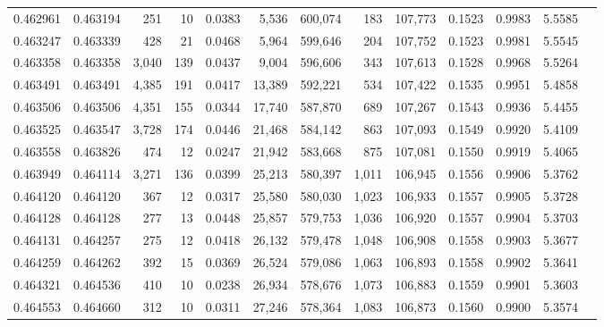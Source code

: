 \begin{tabular}{rrrrrrrrrrrrr}
0.462961 & 0.463194 &   251 &    10 &                                     0.0383 &   5,536 & 600,074 &     183 & 107,773 & 0.1523 & 0.9983 & 5.5585 \\
0.463247 & 0.463339 &   428 &    21 &                                     0.0468 &   5,964 & 599,646 &     204 & 107,752 & 0.1523 & 0.9981 & 5.5545 \\
0.463358 & 0.463358 & 3,040 &   139 &                                     0.0437 &   9,004 & 596,606 &     343 & 107,613 & 0.1528 & 0.9968 & 5.5264 \\
0.463491 & 0.463491 & 4,385 &   191 &                                     0.0417 &  13,389 & 592,221 &     534 & 107,422 & 0.1535 & 0.9951 & 5.4858 \\
0.463506 & 0.463506 & 4,351 &   155 &                                     0.0344 &  17,740 & 587,870 &     689 & 107,267 & 0.1543 & 0.9936 & 5.4455 \\
0.463525 & 0.463547 & 3,728 &   174 &                                     0.0446 &  21,468 & 584,142 &     863 & 107,093 & 0.1549 & 0.9920 & 5.4109 \\
0.463558 & 0.463826 &   474 &    12 &                                     0.0247 &  21,942 & 583,668 &     875 & 107,081 & 0.1550 & 0.9919 & 5.4065 \\
0.463949 & 0.464114 & 3,271 &   136 &                                     0.0399 &  25,213 & 580,397 &   1,011 & 106,945 & 0.1556 & 0.9906 & 5.3762 \\
0.464120 & 0.464120 &   367 &    12 &                                     0.0317 &  25,580 & 580,030 &   1,023 & 106,933 & 0.1557 & 0.9905 & 5.3728 \\
0.464128 & 0.464128 &   277 &    13 &                                     0.0448 &  25,857 & 579,753 &   1,036 & 106,920 & 0.1557 & 0.9904 & 5.3703 \\
0.464131 & 0.464257 &   275 &    12 &                                     0.0418 &  26,132 & 579,478 &   1,048 & 106,908 & 0.1558 & 0.9903 & 5.3677 \\
0.464259 & 0.464262 &   392 &    15 &                                     0.0369 &  26,524 & 579,086 &   1,063 & 106,893 & 0.1558 & 0.9902 & 5.3641 \\
0.464321 & 0.464536 &   410 &    10 &                                     0.0238 &  26,934 & 578,676 &   1,073 & 106,883 & 0.1559 & 0.9901 & 5.3603 \\
0.464553 & 0.464660 &   312 &    10 &                                     0.0311 &  27,246 & 578,364 &   1,083 & 106,873 & 0.1560 & 0.9900 & 5.3574 \\

\end{tabular}
